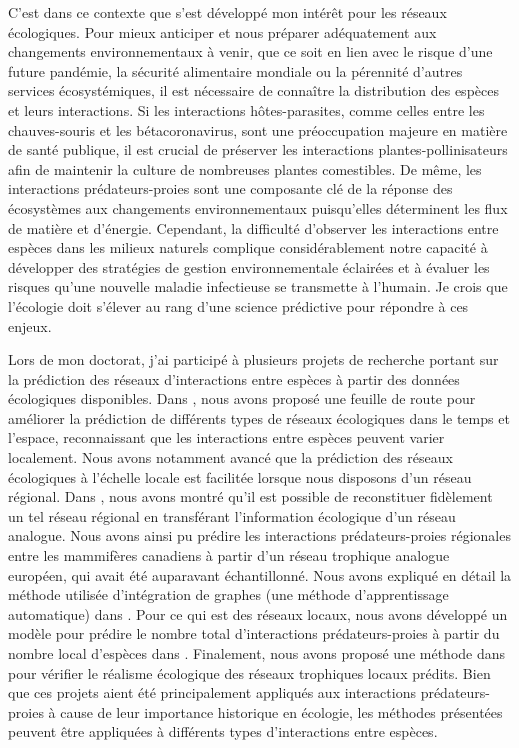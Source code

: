 \documentclass[12pt,twoside,phd]{dms}
\numberwithin{equation}{section}
\numberwithin{table}{chapter}
\numberwithin{figure}{chapter}
\begin{document}
C'est dans ce contexte que s'est développé mon intérêt pour les réseaux
écologiques. Pour mieux anticiper et nous préparer adéquatement aux changements
environnementaux à venir, que ce soit en lien avec le risque d'une future
pandémie, la sécurité alimentaire mondiale ou la pérennité d'autres services
écosystémiques, il est nécessaire de connaître la distribution des espèces et
leurs interactions. Si les interactions hôtes-parasites, comme celles entre les
chauves-souris et les bétacoronavirus, sont une préoccupation majeure en matière
de santé publique, il est crucial de préserver les interactions
plantes-pollinisateurs afin de maintenir la culture de nombreuses plantes
comestibles. De même, les interactions prédateurs-proies sont une composante clé
de la réponse des écosystèmes aux changements environnementaux puisqu'elles
déterminent les flux de matière et d'énergie. Cependant, la difficulté
d'observer les interactions entre espèces dans les milieux naturels complique
considérablement notre capacité à développer des stratégies de gestion
environnementale éclairées et à évaluer les risques qu'une nouvelle maladie
infectieuse se transmette à l'humain. Je crois que l'écologie doit s'élever au
rang d'une science prédictive pour répondre à ces enjeux.

Lors de mon doctorat, j'ai participé à plusieurs projets de recherche portant
sur la prédiction des réseaux d'interactions entre espèces à partir des données
écologiques disponibles. Dans \cite{Strydom2021Roadmapa}, nous avons proposé une
feuille de route pour améliorer la prédiction de différents types de réseaux
écologiques dans le temps et l'espace, reconnaissant que les interactions entre
espèces peuvent varier localement. Nous avons notamment avancé que la prédiction
des réseaux écologiques à l'échelle locale est facilitée lorsque nous disposons
d'un réseau régional. Dans \cite{Strydom2022Food}, nous avons montré qu'il est
possible de reconstituer fidèlement un tel réseau régional en transférant
l'information écologique d'un réseau analogue. Nous avons ainsi pu prédire les
interactions prédateurs-proies régionales entre les mammifères canadiens à
partir d'un réseau trophique analogue européen, qui avait été auparavant
échantillonné. Nous avons expliqué en détail la méthode utilisée d'intégration
de graphes (une méthode d'apprentissage automatique) dans
\cite{Strydom2023Grapha}. Pour ce qui est des réseaux locaux, nous avons
développé un modèle pour prédire le nombre total d'interactions
prédateurs-proies à partir du nombre local d'espèces dans
\cite{MacDonald2020Revisiting}. Finalement, nous avons proposé une méthode dans
\cite{Higino2023Mismatch} pour vérifier le réalisme écologique des réseaux
trophiques locaux prédits. Bien que ces projets aient été principalement
appliqués aux interactions prédateurs-proies à cause de leur importance
historique en écologie, les méthodes présentées peuvent être appliquées à
différents types d'interactions entre espèces. 
\end{document}
